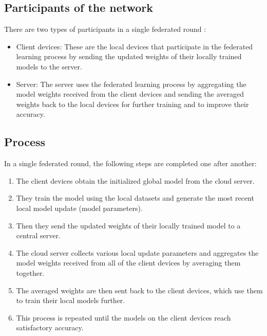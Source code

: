 \subsection{Participants of the network}

There are two types of participants in a single federated round :
\begin{itemize}
    \item Client devices: These are the local devices that participate in the federated learning process by sending the updated weights of their locally trained models to the server.
    \item Server: The server uses the federated learning process by aggregating the model weights received from the client devices and sending the averaged weights back to the local devices for further training and to improve their accuracy.
\end{itemize}

\subsection{Process}

In a single federated round, the following steps are completed one after another: 
\begin{enumerate}
    \item The client devices obtain the initialized global model from the cloud server.
    \item They train the model using the local datasets and generate the most recent local model update (model parameters).
    \item Then they send the updated weights of their locally trained model to a central server. 
    \item The cloud server collects various local update parameters and aggregates the model weights received from all of the client devices by averaging them together.
    \item The averaged weights are then sent back to the client devices, which use them to train their local models further.
    \item This process is repeated until the models on the client devices reach satisfactory accuracy.
\end{enumerate}

